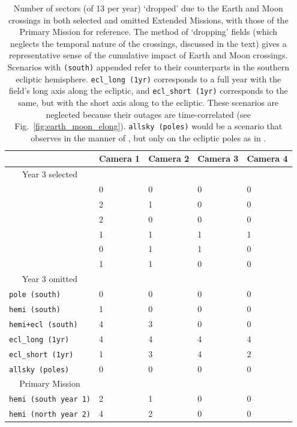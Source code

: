 \begin{table}[!tb]
	\centering
	\begin{tabular}{ | l | l | l | l | l | }
		\hline
		\ & Camera 1 & Camera 2 & Camera 3 & Camera 4 \\ \hline
		\multicolumn{1}{|c|}{Year 3 selected} & \  & \  & \  & \  \\ \hline
		\npole & 0 & 0 & 0 & 0 \\ \hline
		\nhemi & 2 & 1 & 0 & 0 \\ \hline
		\shemiAvoid & 2 & 0 & 0 & 0 \\ \hline
		\elong & 1 & 1 & 1 & 1 \\ \hline
		\eshort & 0 & 1 & 1 & 0 \\ \hline
		\hemis & 1 & 1 & 0 & 0 \\ \hline
		\multicolumn{1}{|c|}{Year 3 omitted} & \  & \  & \  & \  \\ \hline
		\texttt{pole\,(south)}  & 0 & 0 & 0 & 0 \\ \hline
		\texttt{hemi\,(south)} & 1 & 0 & 0 & 0 \\ \hline
		\texttt{hemi+ecl\,(south)} & 4 & 3 & 0 & 0 \\ \hline
		\texttt{ecl\_long\,(1yr)} & 4 & 4 & 4 & 4 \\ \hline
		\texttt{ecl\_short\,(1yr)} & 1 & 3 & 4 & 2 \\ \hline
		\texttt{allsky\,(poles)} & 0 & 0 & 0 & 0 \\ \hline
		\multicolumn{1}{|c|}{Primary Mission} & \  & \  & \  & \  \\ \hline
		\texttt{hemi\,(south year 1)} & 2 & 1 & 0 & 0 \\ \hline
		\texttt{hemi\,(north year 2)} & 4 & 2 & 0 & 0 \\ \hline
	\end{tabular}
	\caption{Number of sectors (of 13 per year) `dropped' due to the Earth and Moon crossings in both selected and omitted Extended Missions, with those of the Primary Mission for reference. The method of `dropping' fields (which neglects the temporal nature of the crossings, discussed in the text) gives a representative sense of the cumulative impact of Earth and Moon crossings. 
	Scenarios with \texttt{(south)} appended refer to their counterparts in the southern ecliptic hemisphere.
	\texttt{ecl\_long\,(1yr)} corresponds to a full year with the \tess field's long axis along the ecliptic, and \texttt{ecl\_short\,(1yr)} corresponds to the same, but with the short axis along to the ecliptic. These scenarios are neglected because their outages are time-correlated (see Fig.~\protect\ref{fig:earth_moon_elong}).
	\texttt{allsky\,(poles)} would be a scenario that observes in the manner of \hemis, but only on the ecliptic poles as in \npole.}
	\label{tab:dropped_fields}
\end{table}
